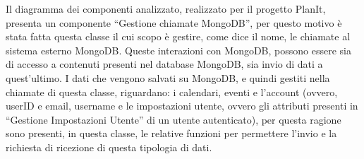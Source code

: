 \begin{listaPersonale}[DCL]{}
    Il diagramma dei componenti analizzato, realizzato per il progetto PlanIt, presenta un componente “Gestione chiamate MongoDB”, per questo motivo è stata fatta questa classe il cui scopo è gestire, come dice il nome, le chiamate al sistema esterno MongoDB. Queste interazioni con MongoDB, possono essere sia di accesso a contenuti presenti nel database MongoDB, sia invio di dati a quest'ultimo. I dati che vengono salvati su MongoDB, e quindi gestiti nella chiamate di questa classe, riguardano: i calendari, eventi e l'account (ovvero, userID e email, username e le impostazioni utente, ovvero gli attributi presenti in “Gestione Impostazioni Utente” di un utente autenticato), per questa ragione sono presenti, in questa classe, le relative funzioni per permettere l'invio e la richiesta di ricezione di questa tipologia di dati.


\end{listaPersonale}